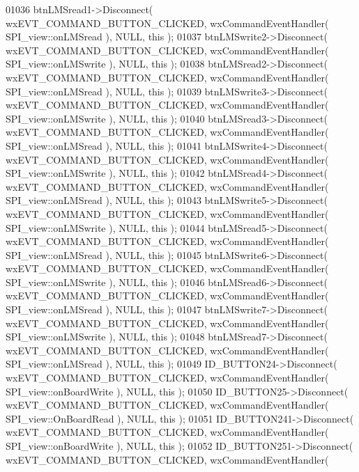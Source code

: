 \begin{DoxyCode}
01036     btnLMSread1->Disconnect( wxEVT\_COMMAND\_BUTTON\_CLICKED, wxCommandEventHandler( 
      SPI_view::onLMSread ), NULL, \textcolor{keyword}{this} );
01037     btnLMSwrite2->Disconnect( wxEVT\_COMMAND\_BUTTON\_CLICKED, wxCommandEventHandler( 
      SPI_view::onLMSwrite ), NULL, \textcolor{keyword}{this} );
01038     btnLMSread2->Disconnect( wxEVT\_COMMAND\_BUTTON\_CLICKED, wxCommandEventHandler( 
      SPI_view::onLMSread ), NULL, \textcolor{keyword}{this} );
01039     btnLMSwrite3->Disconnect( wxEVT\_COMMAND\_BUTTON\_CLICKED, wxCommandEventHandler( 
      SPI_view::onLMSwrite ), NULL, \textcolor{keyword}{this} );
01040     btnLMSread3->Disconnect( wxEVT\_COMMAND\_BUTTON\_CLICKED, wxCommandEventHandler( 
      SPI_view::onLMSread ), NULL, \textcolor{keyword}{this} );
01041     btnLMSwrite4->Disconnect( wxEVT\_COMMAND\_BUTTON\_CLICKED, wxCommandEventHandler( 
      SPI_view::onLMSwrite ), NULL, \textcolor{keyword}{this} );
01042     btnLMSread4->Disconnect( wxEVT\_COMMAND\_BUTTON\_CLICKED, wxCommandEventHandler( 
      SPI_view::onLMSread ), NULL, \textcolor{keyword}{this} );
01043     btnLMSwrite5->Disconnect( wxEVT\_COMMAND\_BUTTON\_CLICKED, wxCommandEventHandler( 
      SPI_view::onLMSwrite ), NULL, \textcolor{keyword}{this} );
01044     btnLMSread5->Disconnect( wxEVT\_COMMAND\_BUTTON\_CLICKED, wxCommandEventHandler( 
      SPI_view::onLMSread ), NULL, \textcolor{keyword}{this} );
01045     btnLMSwrite6->Disconnect( wxEVT\_COMMAND\_BUTTON\_CLICKED, wxCommandEventHandler( 
      SPI_view::onLMSwrite ), NULL, \textcolor{keyword}{this} );
01046     btnLMSread6->Disconnect( wxEVT\_COMMAND\_BUTTON\_CLICKED, wxCommandEventHandler( 
      SPI_view::onLMSread ), NULL, \textcolor{keyword}{this} );
01047     btnLMSwrite7->Disconnect( wxEVT\_COMMAND\_BUTTON\_CLICKED, wxCommandEventHandler( 
      SPI_view::onLMSwrite ), NULL, \textcolor{keyword}{this} );
01048     btnLMSread7->Disconnect( wxEVT\_COMMAND\_BUTTON\_CLICKED, wxCommandEventHandler( 
      SPI_view::onLMSread ), NULL, \textcolor{keyword}{this} );
01049     ID_BUTTON24->Disconnect( wxEVT\_COMMAND\_BUTTON\_CLICKED, wxCommandEventHandler( 
      SPI_view::onBoardWrite ), NULL, \textcolor{keyword}{this} );
01050     ID_BUTTON25->Disconnect( wxEVT\_COMMAND\_BUTTON\_CLICKED, wxCommandEventHandler( 
      SPI_view::OnBoardRead ), NULL, \textcolor{keyword}{this} );
01051     ID_BUTTON241->Disconnect( wxEVT\_COMMAND\_BUTTON\_CLICKED, wxCommandEventHandler( 
      SPI_view::onBoardWrite ), NULL, \textcolor{keyword}{this} );
01052     ID_BUTTON251->Disconnect( wxEVT\_COMMAND\_BUTTON\_CLICKED, wxCommandEventHandler( 

\end{DoxyCode}
